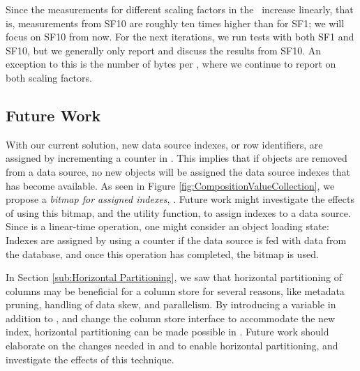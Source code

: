 Since the measurements for different scaling factors in the \tpchdl~increase linearly, that is, measurements from SF10 are roughly ten times higher than for SF1; we will focus on SF10 from now. For the next iterations, we run tests with both SF1 and SF10, but we generally only report and discuss the results from SF10. An exception to this is the number of bytes per \lineitem, where we continue to report on both scaling factors.

\subsection{Future Work}
\label{sub:column-store:future-work}
With our current solution, new data source indexes, or row identifiers, are assigned by incrementing a counter in . This implies that if objects are removed from a data source, no new objects will be assigned the data source indexes that has become available. As seen in Figure \ref{fig:CompositionValueCollection}, we propose a \textit{bitmap for assigned indexes}, . Future work might investigate the effects of using this bitmap, and the  utility function, to assign indexes to a data source. Since  is a linear-time operation, one might consider an object loading state: Indexes are assigned by using a counter if the data source is fed with data from the database, and once this operation has completed, the  bitmap is used.

In Section \ref{sub:Horizontal Partitioning}, we saw that horizontal partitioning of columns may be beneficial for a column store for several reasons, like metadata pruning, handling of data skew, and parallelism. By introducing a  variable in addition to , and change the column store interface to accommodate the new index, horizontal partitioning can be made possible in \gap. Future work should elaborate on the changes needed in  and  to enable horizontal partitioning, and investigate the effects of this technique.


